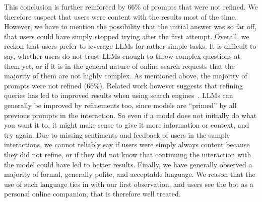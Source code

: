 This conclusion is further reinforced by 66\% of prompts that were not refined.
We therefore suspect that users were content with the results most of the time.
However, we have to mention the possibility that the initial answer was so far off,
that users could have simply stopped trying after the first attempt.
Overall, we reckon that users prefer to leverage LLMs for rather simple tasks.
It is difficult to say, whether users do not trust LLMs enough to throw complex questions at
them yet, or if it is in the general nature of online search requests that the majority of
them are not highly complex.
As mentioned above, the majority of prompts were not refined (66\%).
Related work however suggests that refining queries has led to improved results when using search
engines~\cite{huang_analyzing_2009}.
LLMs can generally be improved by refinements too, since models are “primed” by all previous
prompts in the interaction.
So even if a model does not initially do what you want it to, it might make
sense to give it more information or context, and try again.
Due to missing sentiments and feedback of users in the sample interactions, we cannot reliably say
if users were simply always content because they did not refine, or if they did not know that
continuing the interaction with the model could have led to better results.
Finally, we have generally observed a majority of formal, generally polite, and acceptable language.
We reason that the use of such language ties in with our first observation, and users see
the bot as a personal online companion, that is therefore well treated.

